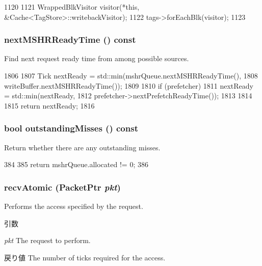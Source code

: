 \begin{DoxyCode}
1120 {
1121     WrappedBlkVisitor visitor(*this, &Cache<TagStore>::writebackVisitor);
1122     tags->forEachBlk(visitor);
1123 }
\end{DoxyCode}
\hypertarget{classCache_a4601a57ba7740776052541f212c29cbd}{
\subsubsection[{nextMSHRReadyTime}]{ nextMSHRReadyTime () const}}
\label{classCache_a4601a57ba7740776052541f212c29cbd}
Find next request ready time from among possible sources. 


\begin{DoxyCode}
1806 {
1807     Tick nextReady = std::min(mshrQueue.nextMSHRReadyTime(),
1808                               writeBuffer.nextMSHRReadyTime());
1809 
1810     if (prefetcher) {
1811         nextReady = std::min(nextReady,
1812                              prefetcher->nextPrefetchReadyTime());
1813     }
1814 
1815     return nextReady;
1816 }
\end{DoxyCode}
\hypertarget{classCache_ac40e843a35136aebfb61fc0c9f57aa27}{
\subsubsection[{outstandingMisses}]{\setlength{\rightskip}{0pt plus 5cm}bool outstandingMisses () const}}
\label{classCache_ac40e843a35136aebfb61fc0c9f57aa27}
Return whether there are any outstanding misses. 


\begin{DoxyCode}
384     {
385         return mshrQueue.allocated != 0;
386     }
\end{DoxyCode}
\hypertarget{classCache_a5f0b4c4a94f6b0053f9d7a4eb9c2518a}{
\subsubsection[{recvAtomic}]{ recvAtomic ({\bf PacketPtr} {\em pkt})}}
\label{classCache_a5f0b4c4a94f6b0053f9d7a4eb9c2518a}
Performs the access specified by the request. 
\begin{DoxyParams}{引数}
\item[{\em pkt}]The request to perform. \end{DoxyParams}
\begin{DoxyReturn}{戻り値}
The number of ticks required for the access. 
\end{DoxyReturn}



